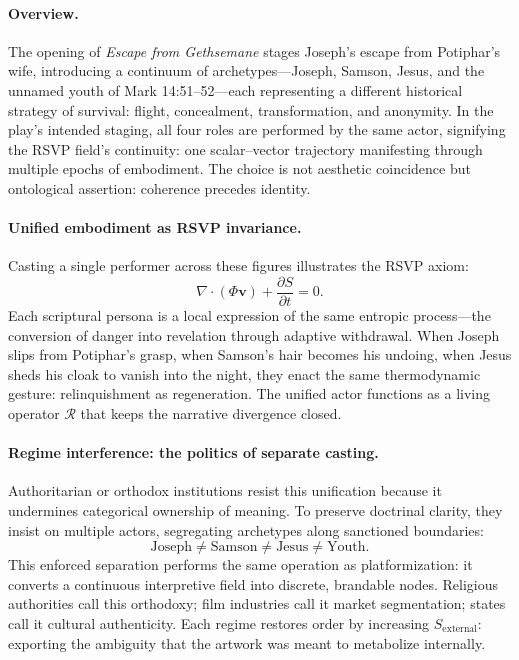 \documentclass[12pt]{article}
\begin{document}
\paragraph{Overview.}
The opening of \emph{Escape from Gethsemane} stages Joseph’s escape from Potiphar’s wife, introducing a continuum of archetypes—Joseph, Samson, Jesus, and the unnamed youth of Mark 14:51–52—each representing a different historical strategy of survival: flight, concealment, transformation, and anonymity.  
In the play’s intended staging, all four roles are performed by the same actor, signifying the RSVP field’s continuity: one scalar–vector trajectory manifesting through multiple epochs of embodiment.  
The choice is not aesthetic coincidence but ontological assertion: coherence precedes identity.

\paragraph{Unified embodiment as RSVP invariance.}
Casting a single performer across these figures illustrates the RSVP axiom:
\[
\nabla\!\cdot(\Phi\mathbf{v}) + \frac{\partial S}{\partial t} = 0.
\]
Each scriptural persona is a local expression of the same entropic process—the conversion of danger into revelation through adaptive withdrawal.  
When Joseph slips from Potiphar’s grasp, when Samson’s hair becomes his undoing, when Jesus sheds his cloak to vanish into the night, they enact the same thermodynamic gesture: relinquishment as regeneration.  
The unified actor functions as a living operator $\mathcal{R}$ that keeps the narrative divergence closed.

\paragraph{Regime interference: the politics of separate casting.}
Authoritarian or orthodox institutions resist this unification because it undermines categorical ownership of meaning.  
To preserve doctrinal clarity, they insist on multiple actors, segregating archetypes along sanctioned boundaries:
\[
\text{Joseph} \neq \text{Samson} \neq \text{Jesus} \neq \text{Youth}.
\]
This enforced separation performs the same operation as platformization: it converts a continuous interpretive field into discrete, brandable nodes.  
Religious authorities call this orthodoxy; film industries call it market segmentation; states call it cultural authenticity.  
Each regime restores order by increasing $S_{\text{external}}$: exporting the ambiguity that the artwork was meant to metabolize internally.
\end{document}

